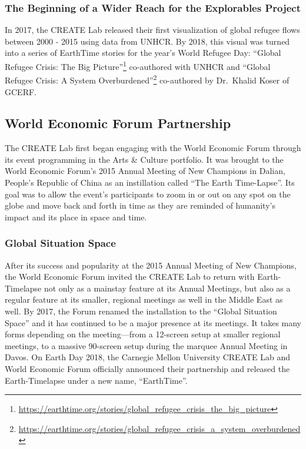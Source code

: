 \documentclass[
  12pt,
]{krantz}
\renewcommand{\href}[2]{#2\footnote{\url{#1}}}
\begin{document}
\hypertarget{the-beginning-of-a-wider-reach-for-the-explorables-project}{%
\subsubsection*{The Beginning of a Wider Reach for the Explorables Project}\label{the-beginning-of-a-wider-reach-for-the-explorables-project}}


In 2017, the CREATE Lab released their first visualization of global refugee flows between 2000 - 2015 using data from UNHCR. By 2018, this visual was turned into a series of EarthTime stories for the year's World Refugee Day: \href{https://earthtime.org/stories/global_refugee_crisis_the_big_picture}{``Global Refugee Crisis: The Big Picture''} co-authored with UNHCR and \href{https://earthtime.org/stories/global_refugee_crisis_a_system_overburdened}{``Global Refugee Crisis: A System Overburdened''} co-authored by Dr.~Khalid Koser of GCERF.

\hypertarget{world-economic-forum-partnership}{%
\subsection{World Economic Forum Partnership}\label{world-economic-forum-partnership}}

The CREATE Lab first began engaging with the World Economic Forum through its event programming in the Arts \& Culture portfolio. It was brought to the World Economic Forum's 2015 Annual Meeting of New Champions in Dalian, People's Republic of China as an instillation called ``The Earth Time-Lapse''. Its goal was to allow the event's participants to zoom in or out on any spot on the globe and move back and forth in time as they are reminded of humanity's impact and its place in space and time.

\hypertarget{global-situation-space}{%
\subsubsection*{Global Situation Space}\label{global-situation-space}}


After its success and popularity at the 2015 Annual Meeting of New Champions, the World Economic Forum invited the CREATE Lab to return with Earth-Timelapse not only as a mainstay feature at its Annual Meetings, but also as a regular feature at its smaller, regional meetings as well in the Middle East as well. By 2017, the Forum renamed the installation to the ``Global Situation Space'' and it has continued to be a major presence at its meetings. It takes many forms depending on the meeting---from a 12-screen setup at smaller regional meetings, to a massive 90-screen setup during the marquee Annual Meeting in Davos. On Earth Day 2018, the Carnegie Mellon University CREATE Lab and World Economic Forum officially announced their partnership and released the Earth-Timelapse under a new name, ``EarthTime''.
\end{document}
